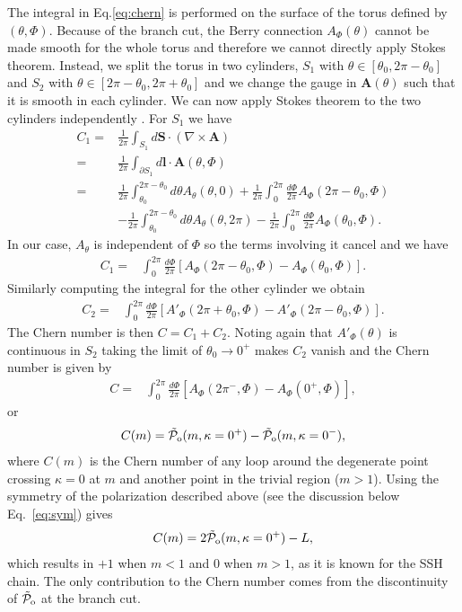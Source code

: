 \documentclass[twocolumn,amsmath,longbibliography,amssymb,superscriptaddress]{revtex4-1}
\newcommand{\tpo}{\tilde{\mathcal{P}}_{\rm o}}
\begin{document}
The integral in Eq.\eqref{eq:chern} is performed on the surface of the torus defined by $(\theta,\Phi)$. Because of the branch cut, the Berry connection $A_\Phi(\theta)$ cannot be made smooth for the whole torus and therefore we cannot directly apply Stokes theorem. Instead, we split the torus in two cylinders, $S_1$ with $\theta\in[\theta_0,2\pi-\theta_0]$ and  $S_2$ with $\theta\in[2\pi-\theta_0,2\pi+\theta_0]$ and we change the gauge in $\boldsymbol{A}(\theta)$ such that it is smooth in each cylinder. We can now apply Stokes theorem to the two cylinders independently \cite{Kohmoto1985}. For $S_1$ we have
\begin{align}
C_1 =& \frac{1}{2\pi} \int_{S_1} d\boldsymbol{S}\cdot (\nabla \times \boldsymbol{A}) \nonumber\\
=&\frac{1}{2\pi} \int_{\partial S_1} d\boldsymbol{l}\cdot \boldsymbol{A}(\theta,\Phi) \nonumber\\
=& \frac{1}{2\pi} \int_{\theta_0}^{2\pi-{\theta_0}} d\theta A_\theta(\theta,0) +\frac{1}{2\pi}\int_0^{2\pi} \frac{d\Phi}{2\pi} A_\Phi (2\pi-{\theta_0},\Phi) \nonumber\\
&-\frac{1}{2\pi}\int_{\theta_0}^{2\pi-{\theta_0}} d\theta A_\theta(\theta,2\pi) -\frac{1}{2\pi}\int_0^{2\pi} \frac{d\Phi}{2\pi} A_\Phi ({\theta_0},\Phi).
\end{align}
In our case, $A_\theta$ is independent of $\Phi$ so the terms involving it cancel and we have
\begin{align}
C_1 =& \int_0^{2\pi} \frac{d\Phi}{2\pi} [A_\Phi (2\pi-{\theta_0},\Phi) -A_\Phi ({\theta_0},\Phi)].
\end{align}
Similarly computing the integral for the other cylinder we obtain
\begin{align}
C_2 =& \int_0^{2\pi} \frac{d\Phi}{2\pi} [A'_\Phi (2\pi+{\theta_0},\Phi) -A'_\Phi (2\pi-{\theta_0},\Phi)].
\end{align}
The Chern number is then $C=C_1+C_2$. Noting again that $A'_\Phi(\theta)$ is continuous in $S_2$ taking the limit of $\theta_0\rightarrow 0^+$ makes $C_2$ vanish and the Chern number is given by
\begin{align}
C =& \int_0^{2\pi} \frac{d\Phi}{2\pi} [A_\Phi (2\pi^-,\Phi) -A_\Phi (0^+,\Phi)],
\end{align}
or
\begin{align}
C(m)= \tpo(m,\kappa=0^+)-\tpo(m,\kappa=0^-),
\end{align}
where $C(m)$ is the Chern number of any loop around the degenerate point crossing $\kappa=0$ at $m$ and another point in the trivial region ($m>1$).
Using the symmetry of the polarization described above (see the discussion below Eq.~\eqref{eq:sym}) gives
\begin{align}
C(m)= 2\tpo(m,\kappa=0^+)-L,
\label{eq:Chern_number}
\end{align}
which results in $+1$ when $m<1$ and $0$ when $m>1$, as it is known for the SSH chain. The only contribution to the Chern number comes from the discontinuity of $\tpo$ at the branch cut. 
\end{document}
